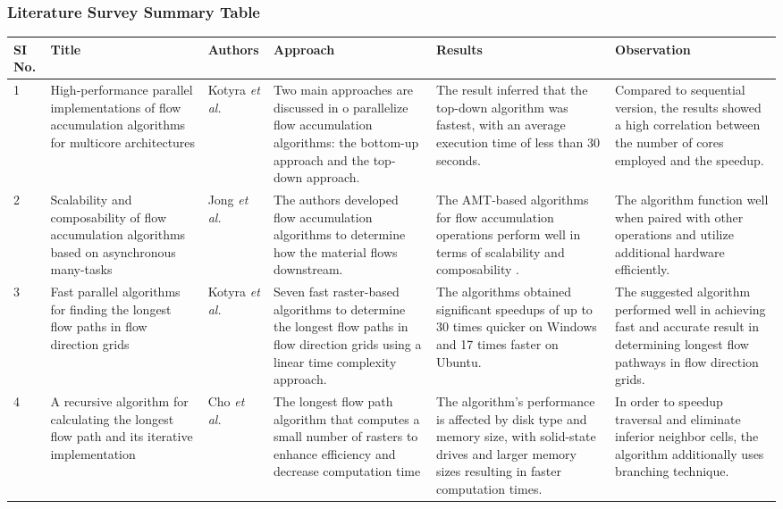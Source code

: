 \documentclass[]{beamer}
\begin{document}
	\begin{frame}
		\frametitle{Literature Survey Summary Table}
		
		\begin{table}[]
			\tiny
			\begin{tabular}{ | p{0.1cm} | p{1.6cm} | p{0.5cm} | p{2cm} | p{2.3cm} |  p{2.3cm} | }
				
				\hline
				\textbf{SI No.} &  \textbf{Title} & \textbf{Authors} & \textbf{Approach} & \textbf{Results} & \textbf{Observation}\\
				\hline
				1     & High-performance parallel implementations of flow accumulation algorithms for multicore architectures & Kotyra \textit{et al.} \cite{KOTYRA2021104741}& Two main approaches are discussed in o parallelize flow accumulation algorithms: the bottom-up approach and the top-down approach.  & The result inferred that the top-down algorithm was fastest, with an average execution time of less than 30 seconds. & Compared to sequential version, the results showed a high correlation between the number of cores employed and the speedup. \\
				\hline
				2     & Scalability and composability of flow accumulation algorithms based on asynchronous many-tasks & Jong \textit{et al.} \cite{DEJONG2022105083} & The authors  developed flow accumulation algorithms to determine how the material flows downstream. & The AMT-based algorithms for flow accumulation operations perform well in terms of scalability and composability .  & The algorithm function well when paired with other operations and utilize additional hardware efficiently. \\
				\hline
				3     & Fast parallel algorithms for finding the longest flow paths in flow direction grids & Kotyra \textit{et al.} \cite{KOTYRA2023105728} & Seven fast raster-based algorithms to determine the longest flow paths in flow direction grids using a linear time complexity approach. & The algorithms obtained significant speedups of up to 30 times quicker on Windows and 17 times faster on Ubuntu. & The suggested algorithm performed well in achieving fast and accurate result in determining longest flow pathways in flow direction grids. \\
				\hline
				4     & A recursive algorithm for calculating the longest flow path and its iterative implementation & Cho \textit{et al.} \cite{CHO2020104774} & The longest flow path algorithm that computes a small number of rasters to enhance efficiency and decrease computation time  & The algorithm's performance is affected by disk type and memory size, with solid-state drives and larger memory sizes resulting in faster computation times.  & In order to speedup traversal and eliminate inferior neighbor cells, the algorithm additionally uses branching technique. \\
				\hline
			\end{tabular}
		\end{table}
	\end{frame}
\end{document}
